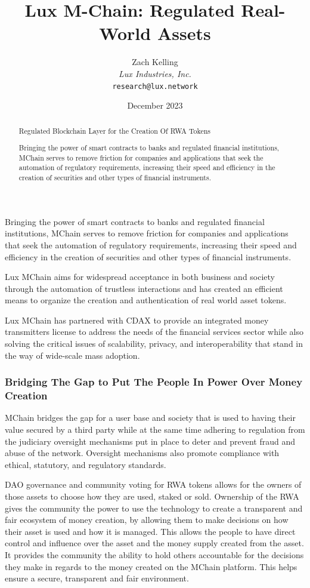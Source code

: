 \documentclass[11pt]{article}
\title{Lux M-Chain: Regulated Real-World Assets}
\author{Zach Kelling\\\textit{Lux Industries, Inc.}\\\texttt{research@lux.network}}
\date{December 2023}
\begin{document}
\luxcoverpage

\begin{abstract}
Regulated Blockchain Layer for the Creation Of RWA Tokens

Bringing the power of smart contracts to banks and regulated financial institutions, MChain serves to remove friction for companies and applications that seek the automation of regulatory requirements, increasing their speed and efficiency in the creation of securities and other types of financial instruments.
\end{abstract}

\tableofcontents
\newpage


Bringing the power of smart contracts to banks and regulated financial institutions, MChain serves to remove friction for companies and applications that seek the automation of regulatory requirements, increasing their speed and efficiency in the creation of securities and other types of financial instruments.


Lux MChain aims for widespread acceptance in both business and society through the automation of trustless interactions and has created an efficient means to organize the creation and authentication of real world asset tokens.


Lux MChain has partnered with CDAX to provide an integrated money transmitters license to address the needs of the financial services sector while also solving the critical issues of scalability, privacy, and interoperability that stand in the way of wide-scale mass adoption.


\subsubsection{Bridging The Gap to Put The People In Power Over Money Creation}

MChain bridges the gap for a user base and society that is used to having their value secured by a third party while at the same time adhering to regulation from the judiciary oversight mechanisms put in place to deter and prevent fraud and abuse of the network. Oversight mechanisms also promote compliance with ethical, statutory, and regulatory standards.


DAO governance and community voting for RWA tokens allows for the owners of those assets to choose how they are used, staked or sold. Ownership of the RWA gives the community the power to use the technology to create a transparent and fair ecosystem of money creation, by allowing them to make decisions on how their asset is used and how it is managed. This allows the people to have direct control and influence over the asset and the money supply created from the asset. It provides the community the ability to hold others accountable for the decisions they make in regards to the money created on the MChain platform. This helps ensure a secure, transparent and fair environment.
\end{document}
